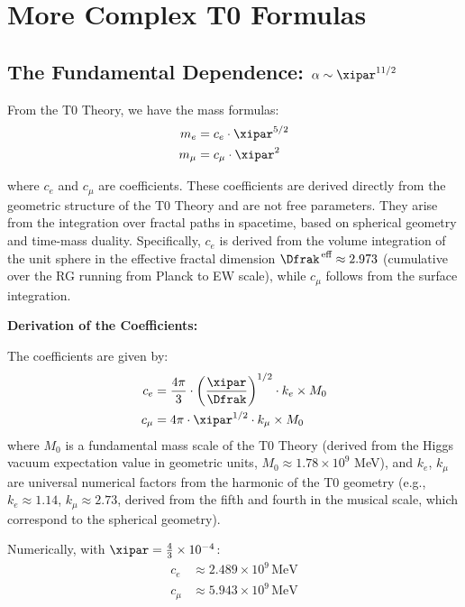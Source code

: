 	\section{More Complex T0 Formulas}
	
	\subsection{The Fundamental Dependence: $\alpha \sim \xipar^{11/2}$}
	
	From the T0 Theory, we have the mass formulas:
	\begin{align}
		m_e &= c_e \cdot \xipar^{5/2} \\
		m_\mu &= c_\mu \cdot \xipar^2
	\end{align}
	
	where $c_e$ and $c_\mu$ are coefficients. These coefficients are derived directly from the geometric structure of the T0 Theory and are not free parameters. They arise from the integration over fractal paths in spacetime, based on spherical geometry and time-mass duality. Specifically, $c_e$ is derived from the volume integration of the unit sphere in the effective fractal dimension $\Dfrak^{\,\text{eff}} \approx 2.973$ (cumulative over the RG running from Planck to EW scale), while $c_\mu$ follows from the surface integration.
	
	\textbf{Derivation of the Coefficients:}
	
	The coefficients are given by:
	\begin{align}
		c_e &= \frac{4\pi}{3} \cdot \left(\frac{\xipar}{\Dfrak}\right)^{1/2} \cdot k_e \times M_0 \\
		c_\mu &= 4\pi \cdot \xipar^{1/2} \cdot k_\mu \times M_0
	\end{align}
	where $M_0$ is a fundamental mass scale of the T0 Theory (derived from the Higgs vacuum expectation value in geometric units, $M_0 \approx 1.78 \times 10^9$ MeV), and $k_e$, $k_\mu$ are universal numerical factors from the harmonic of the T0 geometry (e.g., $k_e \approx 1.14$, $k_\mu \approx 2.73$, derived from the fifth and fourth in the musical scale, which correspond to the spherical geometry).
	
	Numerically, with $\xipar = \frac{4}{3} \times 10^{-4}$:
	\begin{align}
		c_e &\approx 2.489 \times 10^9 \, \text{MeV} \\
		c_\mu &\approx 5.943 \times 10^9 \, \text{MeV}
	\end{align}
	
